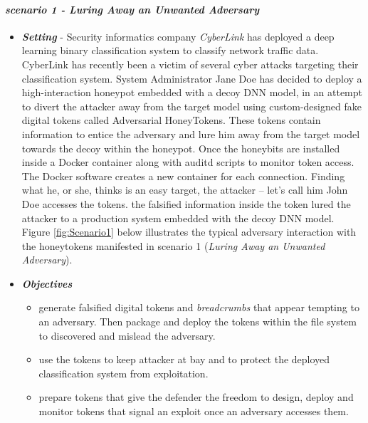 \documentclass[grad,lot,lof,11pt,oneside,onehalfspace]{RUthesis}
\begin{document}
\paragraph{\textit{scenario 1 - Luring Away an Unwanted Adversary}}
\begin{itemize}
		\item \textit{\textbf{Setting}}\newline
		- Security informatics company \textit{CyberLink} has deployed a deep learning binary classification system to classify network traffic data. CyberLink has recently been a victim of several cyber attacks targeting their classification system. System Administrator Jane Doe has decided to deploy a high-interaction honeypot embedded with a decoy DNN model, in an attempt to divert the attacker away from the target model using custom-designed fake digital tokens called Adversarial HoneyTokens. These tokens contain information to entice the adversary and lure him away from the target model towards the decoy within the honeypot. Once the honeybits are installed inside a Docker container along with auditd scripts to monitor token access. The Docker software creates a new container for each connection. Finding what he, or she, thinks is an easy target, the attacker – let's call him John Doe accesses the tokens. the falsified information inside the token lured the attacker to a production system embedded with the decoy DNN model. Figure \ref*{fig:Scenario1} below illustrates the typical adversary interaction with the honeytokens manifested in scenario 1 (\textit{Luring Away an Unwanted Adversary}).
		
		\item \textit{\textbf{Objectives}}
		\begin{itemize}
			\item generate falsified digital tokens and \textit{breadcrumbs} that appear tempting to an adversary. Then package and deploy the tokens within the file system to discovered and mislead the adversary. 
			\item use the tokens to keep attacker at bay and to protect the deployed classification system from exploitation. 
			\item prepare tokens that give the defender the freedom to design, deploy and monitor tokens that signal an exploit once an adversary accesses them. 
			

\end{itemize}
\end{itemize}
\end{document}
